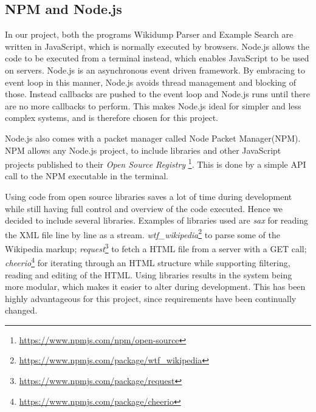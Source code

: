 \subsection{NPM and Node.js}
In our project, both the programs Wikidump Parser and Example Search are written in JavaScript, which is normally executed by browsers. Node.js\cite{node} allows the code to be executed from a terminal instead, which enables JavaScript to be used on servers.  Node.js is an asynchronous event driven framework. By embracing to event loop in this manner, Node.js avoids thread management and blocking of those. Instead callbacks are pushed to the event loop and Node.js runs until there are no more callbacks to perform. This makes Node.js ideal for simpler and less complex systems, and is therefore chosen for this project.

Node.js also comes with a packet manager called Node Packet Manager(NPM). NPM allows any Node.js project, to include libraries and other JavaScript projects published to their \textit{Open Source Registry} \footnote{\url{https://www.npmjs.com/npm/open-source}}. This is done by a simple API call to the NPM executable in the terminal.

Using code from open source libraries saves a lot of time during development while still having full control and overview of the code executed. Hence we decided to include several libraries. Examples of libraries used are \textit{sax} for reading the XML file line by line as a stream.  \textit{wtf\_wikipedia}\footnote{\url{https://www.npmjs.com/package/wtf_wikipedia}} to parse some of the Wikipedia markup;  \textit{request}\footnote{\url{https://www.npmjs.com/package/request}} to fetch a HTML file from a server with a GET call;  \textit{cheerio}\footnote{\url{https://www.npmjs.com/package/cheerio}} for iterating through an HTML structure while supporting filtering, reading and editing of the HTML. Using libraries results in the system being more modular, which makes it easier to alter during development. This has been highly advantageous for this project, since requirements have been continually changed. 


\cleardoublepage